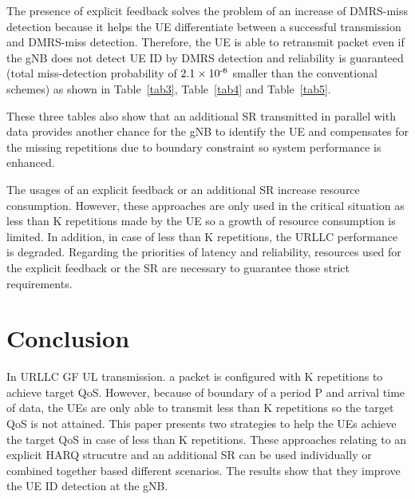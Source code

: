 \documentclass[conference]{IEEEtran}
\begin{document}
The presence of explicit feedback solves the problem of an increase of DMRS-miss detection because it helps the UE differentiate between a successful transmission and DMRS-miss detection. Therefore, the UE is able to retransmit packet even if the gNB does not detect UE ID by DMRS detection and reliability is guaranteed (total miss-detection probability of $2.1\times10\textsuperscript{-6}$ smaller than the conventional schemes) as shown in Table~\ref{tab3}, Table~\ref{tab4} and Table~\ref{tab5}.

These three tables also show that an additional SR transmitted in parallel with data provides another chance for the gNB to identify the UE and compensates for the missing repetitions due to boundary constraint so system performance is enhanced. 

The usages of an explicit feedback or an additional SR increase resource consumption. However, these approaches are only used in the critical situation as less than K repetitions made by the UE so a growth of resource consumption is limited. In addition, in case of less than K repetitions, the URLLC performance is degraded. Regarding the priorities of latency and reliability, resources used for the explicit feedback or the SR are necessary to guarantee those strict requirements.

\section{Conclusion}\label{V}

In URLLC GF UL transmission. a packet is configured with K repetitions to achieve target QoS. However, because of boundary of a period P and arrival time of data, the UEs are only able to transmit less than K repetitions so the target QoS is not attained. This paper presents two strategies to help the UEs achieve the target QoS in case of less than K repetitions. These approaches relating to an explicit HARQ strucutre and an additional SR can be used individually or combined together based different scenarios. The results show that they improve the UE ID detection at the gNB.
\end{document}

